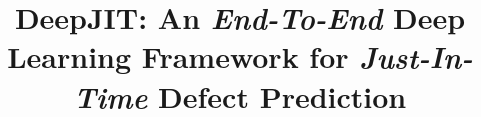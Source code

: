 \documentclass[sigconf]{acmart}
\begin{document}
\title{DeepJIT: An \emph{End-To-End} Deep Learning Framework for \emph{Just-In-Time} Defect Prediction}









\end{document}
